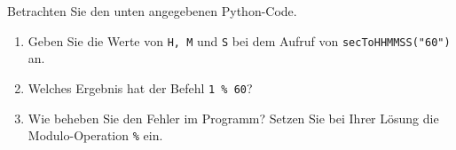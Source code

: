 Betrachten Sie den unten angegebenen Python-Code.
\begin{enumerate}
	\item Geben Sie die Werte von \verb|H, M| und \verb|S| bei dem Aufruf von \verb|secToHHMMSS("60")| an.
	\item Welches Ergebnis hat der Befehl \verb|1 % 60|?
	\item Wie beheben Sie den Fehler im Programm? Setzen Sie bei Ihrer Lösung die Modulo-Operation \verb|%| ein.
\end{enumerate}

